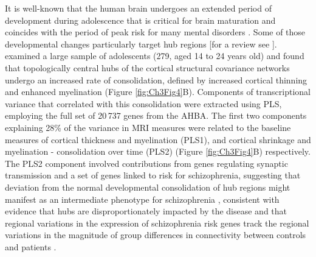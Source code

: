 It is well-known that the human brain undergoes an extended period of development during adolescence that is critical for brain maturation and coincides with the period of peak risk for many mental disorders \citep{Paus2008}. Some of those developmental changes particularly target hub regions \citep{Dennis2013,Hwang2013,Baker2015a} [for a review see \citep{Cao2016}].
\citet{Whitaker2016a} examined a large sample of adolescents (279, aged 14 to 24 years old) and found that topologically central hubs of the cortical structural covariance networks undergo an increased rate of consolidation, defined by increased cortical thinning and enhanced myelination (Figure \ref{fig:Ch3Fig4}B).
Components of transcriptional variance that correlated with this consolidation were extracted using PLS, employing the full set of 20\,737 genes from the AHBA. The first two components explaining 28\% of the variance in MRI measures were related to the baseline measures of cortical thickness and myelination (PLS1), and cortical shrinkage and myelination - consolidation over time (PLS2) (Figure \ref{fig:Ch3Fig4}B) respectively.
The PLS2 component involved contributions from genes regulating synaptic transmission and a set of genes linked to risk for schizophrenia, suggesting that deviation from the normal developmental consolidation of hub regions might manifest as an intermediate phenotype for schizophrenia \citep{Whitaker2016a}, consistent with evidence that hubs are disproportionately impacted by the disease \citep{VanDenHeuvel2013,Crossley2014,Klauser2016} and that regional variations in the expression of schizophrenia risk genes track the regional variations in the magnitude of group differences in connectivity between controls and patients \citep{Romme2017}.

